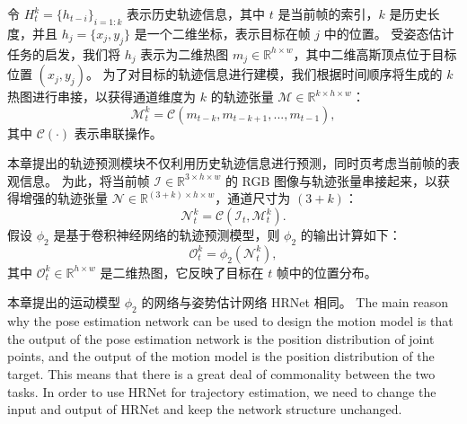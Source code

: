 令 $H_{t}^{k} = \{h_{t-i}\}_{i=1:k}$ 表示历史轨迹信息，其中 $t$ 是当前帧的索引，$k$ 是历史长度，并且 $h_{j} = \{x_{j}, y_{j}\}$ 是一个二维坐标，表示目标在帧 $j$ 中的位置。
受姿态估计任务的启发，我们将 $h_{j}$ 表示为二维热图 $m_{j} \in \mathbb R^{h \times w}$，其中二维高斯顶点位于目标位置 $(x_{j}, y_{j})$。
为了对目标的轨迹信息进行建模，我们根据时间顺序将生成的 $k$ 热图进行串接，以获得通道维度为 $k$ 的轨迹张量 $\mathcal{M} \in \mathbb{R}^{k \times h \times w}$：
\begin{equation}
    \mathcal{M}_{t}^{k} = \mathcal{C}(m_{t-k}, m_{t-k+1}, ..., m_{t-1}),
\end{equation}
其中 $\mathcal{C}(\cdot)$ 表示串联操作。

本章提出的轨迹预测模块不仅利用历史轨迹信息进行预测，同时页考虑当前帧的表观信息。
为此，将当前帧 $\mathcal{I} \in \mathbb{R}^{3 \times h \times w}$ 的 RGB 图像与轨迹张量串接起来，以获得增强的轨迹张量 $\mathcal{N} \in \mathbb{R}^{(3+k) \times h \times w}$，通道尺寸为 $(3+k)$：
\begin{equation}
    \mathcal{N}_{t}^{k} = \mathcal{C}(\mathcal{I}_{t}, \mathcal{M}_{t}^{k}).
\end{equation}
假设 $\phi_{2}$ 是基于卷积神经网络的轨迹预测模型，则 $\phi_{2}$ 的输出计算如下：
\begin{equation}
    \mathcal{O}_{t}^{k} = \phi_{2}(\mathcal{N}_{t}^{k}),
\end{equation}
其中 $\mathcal{O}_{t}^{k} \in \mathbb{R}^{h \times w}$ 是二维热图，它反映了目标在 $t$ 帧中的位置分布。

本章提出的运动模型 $\phi_{2}$ 的网络与姿势估计网络 HRNet \cite{sun2019deep} 相同。
\iffalse
The main reason why the pose estimation network can be used to design the motion model is that the output of the pose estimation network is the position distribution of joint points, and the output of the motion model is the position distribution of the target. This means that there is a great deal of commonality between the two tasks. In order to use HRNet for trajectory estimation, we need to change the input and output of HRNet and keep the network structure unchanged.

